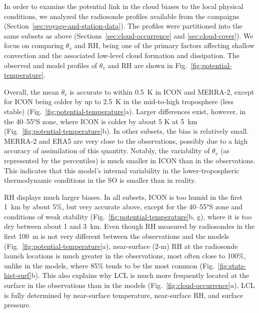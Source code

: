 \documentclass[draft]{agujournal2019}
\begin{document}
In order to examine the potential link in the cloud biases to the local physical conditions, we analyzed the radiosonde profiles available from the campaigns (Section~\ref{sec:voyage-and-station-data}). The profiles were partitioned into the same subsets as above (Sections~\ref{sec:cloud-occurrence} and \ref{sec:cloud-cover}). We focus on comparing $\theta_v$ and RH, being one of the primary factors affecting shallow convection and the associated low-level cloud formation and dissipation. The observed and model profiles of $\theta_v$ and RH are shown in Fig.~\ref{fig:potential-temperature}.

Overall, the mean $\theta_v$ is accurate to within 0.5~K in ICON and MERRA-2, except for ICON being colder by up to 2.5~K in the mid-to-high troposphere (less stable) (Fig.~\ref{fig:potential-temperature}a). Larger differences exist, however, in the 40--55°S zone, where ICON is colder by about 5 K at 5~km (Fig.~\ref{fig:potential-temperature}b). In other subsets, the bias is relatively small. MERRA-2 and ERA5 are very close to the observations, possibly due to a high accuracy of assimilation of this quantity. Notably, the variability of $\theta_v$ (as represented by the percentiles) is much smaller in ICON than in the observations. This indicates that this model's internal variability in the lower-tropospheric thermodynamic conditions in the SO is smaller than in reality.

RH displays much larger biases. In all subsets, ICON is too humid in the first 1~km by about 5\%, but very accurate above, except for the 40--55°S zone and conditions of weak stability (Fig.~\ref{fig:potential-temperature}b, g), where it is too dry between about 1 and 3~km. Even though RH measured by radiosondes in the first 100~m is not very different between the observations and the models (Fig.~\ref{fig:potential-temperature}a), near-surface (2-m) RH at the radiosonde launch locations is much greater in the observations, most often close to 100\%, unlike in the models, where 85\% tends to be the most common (Fig.~\ref{fig:stats-hist-surf}b). This also explains why LCL is much more frequently located at the surface in the observations than in the models (Fig.~\ref{fig:cloud-occurrence}a). LCL is fully determined by near-surface temperature, near-surface RH, and surface pressure.
\end{document}
